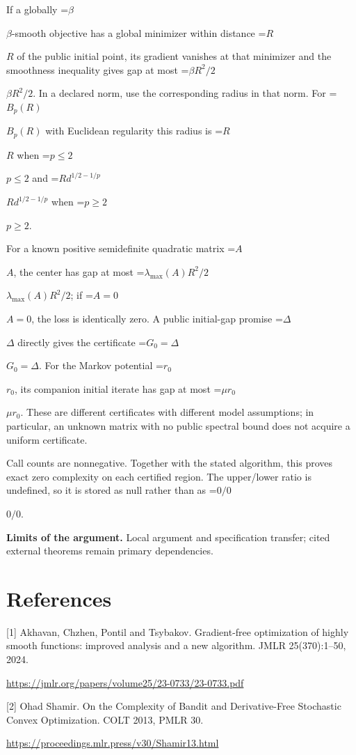 \documentclass[10pt,a4paper]{article}
\newcommand{\AtlasMath}[1]{\par\begingroup\centering\setbox0=\hbox{$\displaystyle #1$}\ifdim\wd0>1.4\linewidth\typeout{ATLAS WIDE FORMULA: \the\wd0}\fi\ifdim\wd0>\linewidth\resizebox{\linewidth}{!}{\box0}\else\box0\fi\par\endgroup}
\newcommand{\AtlasInlineMath}[1]{\begingroup\setbox0=\hbox{$#1$}\ifdim\wd0>.4\linewidth\endgroup\AtlasMath{#1}\else\endgroup$#1$\fi}
\begin{document}
If a globally \AtlasInlineMath{\beta}-smooth objective has a global minimizer within distance \AtlasInlineMath{R} of the public initial point, its gradient vanishes at that minimizer and the smoothness inequality gives gap at most \AtlasInlineMath{\beta R^2/2}. In a declared norm, use the corresponding radius in that norm. For \AtlasInlineMath{B_p(R)} with Euclidean regularity this radius is \AtlasInlineMath{R} when \AtlasInlineMath{p\le2} and \AtlasInlineMath{R d^{1/2-1/p}} when \AtlasInlineMath{p\ge2}.

For a known positive semidefinite quadratic matrix \AtlasInlineMath{A}, the center has gap at most \AtlasInlineMath{\lambda_{\max}(A)R^2/2}; if \AtlasInlineMath{A=0}, the loss is identically zero. A public initial-gap promise \AtlasInlineMath{\Delta} directly gives the certificate \AtlasInlineMath{G_0=\Delta}. For the Markov potential \AtlasInlineMath{r_0}, its companion initial iterate has gap at most \AtlasInlineMath{\mu r_0}. These are different certificates with different model assumptions; in particular, an unknown matrix with no public spectral bound does not acquire a uniform certificate.

Call counts are nonnegative. Together with the stated algorithm, this proves exact zero complexity on each certified region. The upper/lower ratio is undefined, so it is stored as null rather than as \AtlasInlineMath{0/0}.

\textbf{Limits of the argument.} Local argument and specification transfer; cited external theorems remain primary dependencies.

\section{References}
[1] Akhavan, Chzhen, Pontil and Tsybakov. Gradient-free optimization of highly smooth functions: improved analysis and a new algorithm. JMLR 25(370):1--50, 2024.

\url{https://jmlr.org/papers/volume25/23-0733/23-0733.pdf}

[2] Ohad Shamir. On the Complexity of Bandit and Derivative-Free Stochastic Convex Optimization. COLT 2013, PMLR 30.

\url{https://proceedings.mlr.press/v30/Shamir13.html}
\end{document}
